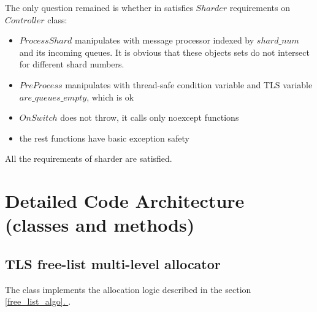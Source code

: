 \documentclass{article}
\newcommand*{\fullref}[1]{\hyperref[{#1}]{\ref*{#1}. \nameref*{#1}}}
\begin{document}
\begin{samepage}
	The only question remained is whether in satisfies $Sharder$ requirements on $Controller$ class:
	\begin{itemize}
		\item $ProcessShard$ manipulates with message processor indexed by $shard\_num$ and its incoming queues. It is obvious that these objects sets do not intersect for different shard numbers.
		\item $PreProcess$ manipulates with thread-safe condition variable and TLS variable\\
			$are\_queues\_empty$, which is ok
		\item $OnSwitch$ does not throw, it calls only noexcept functions
		\item the rest functions have basic exception safety
	\end{itemize}
\end{samepage}
All the requirements of sharder are satisfied.

\newpage
\section{Detailed Code Architecture (classes and methods)}

\subsection{TLS free-list multi-level allocator}

The class implements the allocation logic described in the section \fullref{free_list_algo}.
\end{document}
